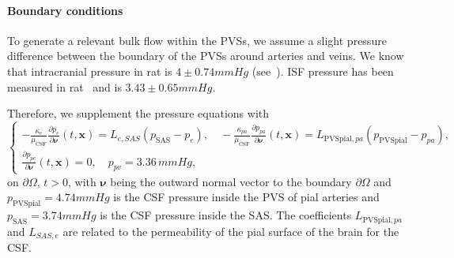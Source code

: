 \documentclass[10pt]{article}
\newcommand{\ie}{\emph{i.e.}\;}
\newcommand{\1}{^{(1)}}
\newcommand{\2}{^{(2)}}
\begin{document}
\paragraph{Boundary conditions}
To generate a relevant bulk flow within the PVSs, we assume a slight pressure difference between the boundary of the PVSs around arteries and veins.
We know that intracranial pressure in rat is $4 \pm 0.74 \si{mmHg}$ (see~\cite{Roy-rat-pressure-2013}). 
ISF pressure has been measured in rat~\cite{Wiig-1983-interstitial} and is $3.43 \pm 0.65  \si{mmHg}$.


Therefore, we supplement the pressure equations with
\begin{equation}
\begin{cases}
    - \frac{\kappa_e}{\mu_\text{CSF}}\frac{\partial p_e}{\partial \pmb{\nu}}(t,\mathbf{x}) = L_{e , SAS}(p_\text{SAS}-p_{e}),\quad -\frac{\kappa_{pa}}{\mu_\text{CSF}}\frac{\partial p_{pa}}{\partial \pmb{ \nu}}(t,\mathbf x)  = L_{\text{PVSpial},pa}(p_{\text{PVSpial}}-p_{pa}), \\
    \frac{\partial p_{pc}}{\partial \pmb{\nu}}(t,\mathbf x) = 0, \quad p_{pv} = 3.36\, \si{mmHg},  %
\end{cases}
\label{eq:BC-4compsPVS}
\end{equation}
$\text{on } \partial \Omega,\, t>0$, with $\pmb{\nu}$ being the outward normal vector to the boundary $\partial \Omega$ and $p_\text{PVSpial} = 4.74\si{mmHg} $ is the CSF pressure inside the PVS of pial arteries and $p_\text{SAS} = 3.74 \si{mmHg} $ is the CSF pressure inside the SAS. The coefficients $L_{\text{PVSpial},pa}$ and $L_{SAS , e}$ are related to the permeability of the pial surface of the brain for the CSF.
\end{document}
